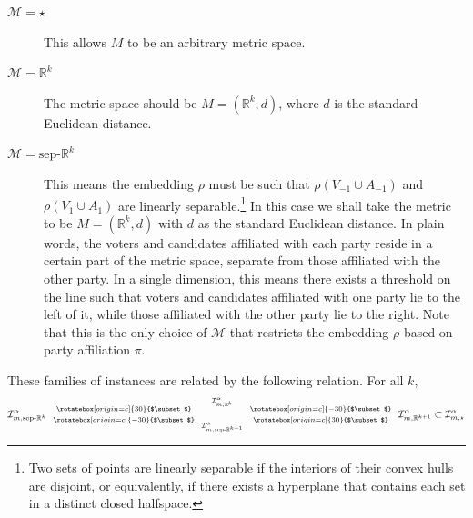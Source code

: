 \documentclass[letterpaper]{article} %
\theoremstyle{definition}
\newcommand{\upsubset}{\mathbin{\rotatebox[origin=c]{30}{$\subset$}}}
\newcommand{\downsubset}{\mathbin{\rotatebox[origin=c]{-30}{$\subset$}}}
\newcommand{\bbR}{\mathbb{R}}
\newcommand{\calI}{\mathcal{I}}
\newcommand{\calM}{\mathcal{M}}
\newcommand{\pleft}{-1}
\newcommand{\pright}{1}
\newcommand{\all}{\star}
\newcommand{\sep}{\textrm{sep-}}
\newcommand{\euc}[1]{\bbR^{#1}}
\newcommand{\eucsep}[1]{\sep\euc{#1}}
\newcommand{\I}{\calI}
\begin{document}
\begin{description}
	\item[$\calM=\star$] This allows $M$ to be an arbitrary metric space.
	\item[$\calM = \bbR^k$] The metric space should be $M = (\bbR^k,d)$, where $d$ is the standard Euclidean distance.
	\item [$\calM = \textrm{sep-}\bbR^k$] This means the embedding $\rho$ must be such that $\rho(V_{\pleft} \cup A_{\pleft})$ and $\rho(V_{\pright} \cup A_{\pright})$ are linearly separable.\footnote{Two sets of points are linearly separable if the interiors of their convex hulls are disjoint, or equivalently, if there exists a hyperplane that contains each set in a distinct closed halfspace.} In this case we shall take the metric to be $M = (\bbR^k,d)$ with $d$ as the standard Euclidean distance. In plain words, the voters and candidates affiliated with each party reside in a certain part of the metric space, separate from those affiliated with the other party. In a single dimension, this means there exists a threshold on the line such that voters and candidates affiliated with one party lie to the left of it, while those affiliated with the other party lie to the right. %
	Note that this is the only choice of $\calM$ that restricts the embedding $\rho$ based on party affiliation $\pi$.
\end{description}
These families of instances are related by the following relation. For all $k$,
$$
\I^{\alpha}_{m,\eucsep{k}} \ \
\substack{\upsubset \\[0.1cm] \downsubset} \ \
\substack{\I^{\alpha}_{m,\euc{k}} \\[0.5cm] \I^{\alpha}_{m,\eucsep{k+1}}} \ \
\substack{\downsubset \\[0.1cm] \upsubset} \ \
\I^{\alpha}_{m,\euc{k+1}} \subset \I^{\alpha}_{m,\all}
$$
\end{document}
